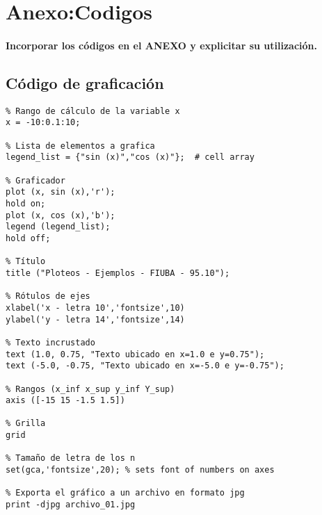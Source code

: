 \documentclass[a4paper,12pt]{article}
\begin{document}
\section{Anexo:Codigos}

\paragraph{Incorporar los códigos en el ANEXO y explicitar su utilización.}
\subsection{Código de graficación}
\begin{verbatim}
% Rango de cálculo de la variable x
x = -10:0.1:10;

% Lista de elementos a grafica
legend_list = {"sin (x)","cos (x)"};  # cell array

% Graficador
plot (x, sin (x),'r');
hold on;
plot (x, cos (x),'b');
legend (legend_list);
hold off;

% Título
title ("Ploteos - Ejemplos - FIUBA - 95.10");

% Rótulos de ejes
xlabel('x - letra 10','fontsize',10)
ylabel('y - letra 14','fontsize',14) 

% Texto incrustado
text (1.0, 0.75, "Texto ubicado en x=1.0 e y=0.75");
text (-5.0, -0.75, "Texto ubicado en x=-5.0 e y=-0.75");

% Rangos (x_inf x_sup y_inf Y_sup)
axis ([-15 15 -1.5 1.5])

% Grilla
grid

% Tamaño de letra de los n
set(gca,'fontsize',20); % sets font of numbers on axes 

% Exporta el gráfico a un archivo en formato jpg
print -djpg archivo_01.jpg 
\end{verbatim}
\end{document}
